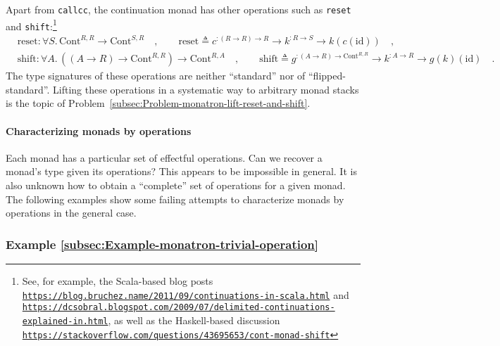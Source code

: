 Apart from \lstinline!callcc!, the continuation monad has other operations
such as \lstinline!reset! and \lstinline!shift!:\footnote{See, for example, the Scala-based blog posts \texttt{\href{https://blog.bruchez.name/2011/09/continuations-in-scala.html}{https://blog.bruchez.name/2011/09/continuations-in-scala.html}}
and \texttt{\href{https://dcsobral.blogspot.com/2009/07/delimited-continuations-explained-in.html}{https://dcsobral.blogspot.com/2009/07/delimited-continuations-explained-in.html}},
as well as the Haskell-based discussion \texttt{\href{https://stackoverflow.com/questions/43695653/cont-monad-shift}{https://stackoverflow.com/questions/43695653/cont-monad-shift}}}
\begin{align*}
 & \text{reset}:\forall S.\,\text{Cont}^{R,R}\rightarrow\text{Cont}^{S,R}\quad,\quad\quad\text{reset}\triangleq c^{:\left(R\rightarrow R\right)\rightarrow R}\rightarrow k^{:R\rightarrow S}\rightarrow k(c(\text{id}))\quad,\\
 & \text{shift}:\forall A.\,((A\rightarrow R)\rightarrow\text{Cont}^{R,R})\rightarrow\text{Cont}^{R,A}\quad,\quad\quad\text{shift}\triangleq g^{:\left(A\rightarrow R\right)\rightarrow\text{Cont}^{R,R}}\rightarrow k^{:A\rightarrow R}\rightarrow g(k)(\text{id})\quad.
\end{align*}
The type signatures of these operations are neither \textsf{``}standard\textsf{''}
nor of \textsf{``}flipped-standard\textsf{''}. Lifting these operations in a systematic
way to arbitrary monad stacks is the topic of Problem~\ref{subsec:Problem-monatron-lift-reset-and-shift}.

\paragraph{Characterizing monads by operations}

Each monad has a particular set of effectful operations. Can we recover
a monad\textsf{'}s type given its operations? This appears to be impossible
in general. It is also unknown how to obtain a \textsf{``}complete\textsf{''} set
of operations for a given monad. The following examples show some
failing attempts to characterize monads by operations in the general
case.

\subsubsection{Example \label{subsec:Example-monatron-trivial-operation}\ref{subsec:Example-monatron-trivial-operation}}

